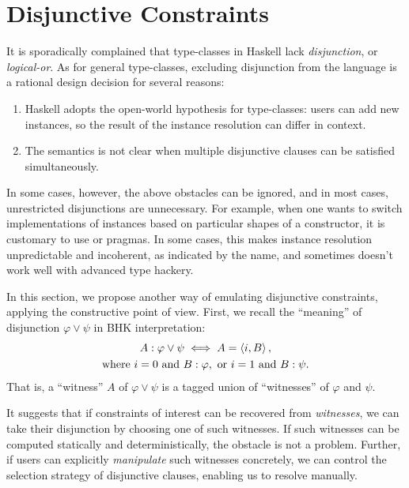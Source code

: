 \documentclass[demotion-paper.tex]{subfiles}
\begin{document}
\section{Disjunctive Constraints}\label{sec:disj}
It is sporadically complained that type-classes in Haskell lack \emph{disjunction}, or \emph{logical-or}.
As for general type-classes, excluding disjunction from the language is a rational design decision for several reasons:
\begin{enumerate}
  \item Haskell adopts the open-world hypothesis for type-classes: users can add new instances, so the result of the instance resolution can differ in context.
  \label{item:openness}
  \item The semantics is not clear when multiple disjunctive clauses can be satisfied simultaneously.
  \label{item:arb-choice}
\end{enumerate}
In some cases, however, the above obstacles can be ignored, and in most cases, unrestricted disjunctions are unnecessary.
For example, when one wants to switch implementations of instances based on particular shapes of a constructor, it is customary to use  or  pragmas.
In some cases, this makes instance resolution unpredictable and incoherent, as indicated by the name, and sometimes doesn't work well with advanced type hackery.

In this section, we propose another way of emulating disjunctive constraints, applying the constructive point of view.
First, we recall the ``meaning'' of disjunction $\varphi \vee \psi$ in BHK interpretation:
\begin{gather*}
      A: \varphi \vee \psi \iff A = \braket{i, B},
    \\
    \text{where }
    i = 0 \text{ and } B: \varphi, \text{ or }
    i = 1 \text{ and } B: \psi.
\end{gather*}
That is, a ``witness'' $A$ of $\varphi \vee \psi$ is a tagged union of ``witnesses'' of $\varphi$ and $\psi$.

It suggests that if constraints of interest can be recovered from \emph{witnesses}, we can take their disjunction by choosing one of such witnesses.
If such witnesses can be computed statically and deterministically, the obstacle  is not a problem.
Further, if users can explicitly \emph{manipulate} such witnesses concretely, we can control the selection strategy of disjunctive clauses, enabling us to resolve  manually.
\end{document}
